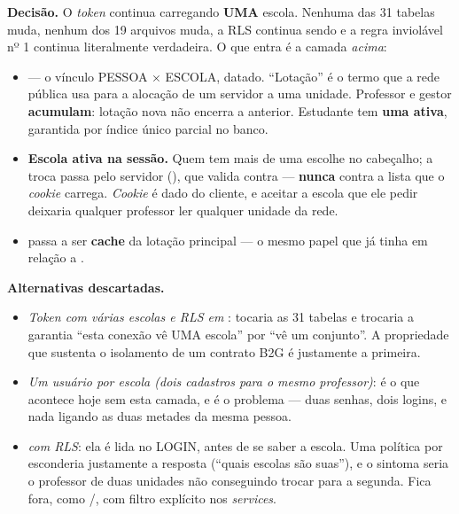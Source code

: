 \textbf{Decisão.} O \emph{token} continua carregando \textbf{UMA} escola. Nenhuma
das 31 tabelas muda, nenhum dos 19 arquivos muda, a RLS continua sendo
 e a regra inviolável nº 1
continua literalmente verdadeira. O que entra é a camada \emph{acima}:

\begin{itemize}
  \item {} --- o vínculo PESSOA $\times$ ESCOLA, datado.
    \enquote{Lotação} é o termo que a rede pública usa para a alocação de um
    servidor a uma unidade. Professor e gestor \textbf{acumulam}: lotação nova não
    encerra a anterior. Estudante tem \textbf{uma ativa}, garantida por índice único
    parcial no banco.
  \item \textbf{Escola ativa na sessão.} Quem tem mais de uma escolhe no
    cabeçalho; a troca passa pelo servidor (), que
    valida contra  --- \textbf{nunca} contra a lista que
    o \emph{cookie} carrega. \emph{Cookie} é dado do cliente, e aceitar a escola
    que ele pedir deixaria qualquer professor ler qualquer unidade da rede.
  \item {} passa a ser \textbf{cache} da lotação principal ---
    o mesmo papel que  já tinha em relação a .
\end{itemize}

\textbf{Alternativas descartadas.}
\begin{itemize}
  \item \emph{\emph{Token} com várias escolas e RLS em }: tocaria
    as 31 tabelas e trocaria a garantia \enquote{esta conexão vê UMA escola} por
    \enquote{vê um conjunto}. A propriedade que sustenta o isolamento de um
    contrato B2G é justamente a primeira.
  \item \emph{Um usuário por escola (dois cadastros para o mesmo professor)}: é o
    que acontece hoje sem esta camada, e é o problema --- duas senhas, dois
    logins, e nada ligando as duas metades da mesma pessoa.
  \item \emph{ com RLS}: ela é lida no LOGIN, antes de se saber a
    escola. Uma política por  esconderia justamente a resposta
    (\enquote{quais escolas são suas}), e o sintoma seria o professor de duas
    unidades não conseguindo trocar para a segunda. Fica fora, como
    /, com filtro explícito nos \emph{services}.
\end{itemize}

